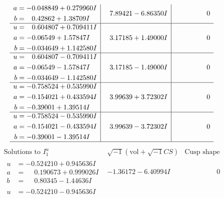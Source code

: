 \documentclass[1p]{elsarticle_modified}
\theoremstyle{definition}
\newcommand{\I}{\sqrt{-1}}
\begin{document}
$$\begin{array}{c|c|c}
\begin{aligned}
a &= -0.048849 + 0.279960 I \\
b &= \phantom{-}0.42862 + 1.38709 I\end{aligned}
 & \phantom{-}7.89421 - 6.86350 I & \phantom{-0.000000 } 0 \\ \hline\begin{aligned}
u &= \phantom{-}0.604807 + 0.709411 I \\
a &= -0.06549 + 1.57847 I \\
b &= -0.034649 + 1.142580 I\end{aligned}
 & \phantom{-}3.17185 + 1.49000 I & \phantom{-0.000000 } 0 \\ \hline\begin{aligned}
u &= \phantom{-}0.604807 - 0.709411 I \\
a &= -0.06549 - 1.57847 I \\
b &= -0.034649 - 1.142580 I\end{aligned}
 & \phantom{-}3.17185 - 1.49000 I & \phantom{-0.000000 } 0 \\ \hline\begin{aligned}
u &= -0.758524 + 0.535990 I \\
a &= -0.154021 + 0.433594 I \\
b &= -0.39001 + 1.39514 I\end{aligned}
 & \phantom{-}3.99639 + 3.72302 I & \phantom{-0.000000 } 0 \\ \hline\begin{aligned}
u &= -0.758524 - 0.535990 I \\
a &= -0.154021 - 0.433594 I \\
b &= -0.39001 - 1.39514 I\end{aligned}
 & \phantom{-}3.99639 - 3.72302 I & \phantom{-0.000000 } 0\\
 \hline 
 \end{array}$$\newpage$$\begin{array}{c|c|c}  
\text{Solutions to }I^u_{1}& \I (\text{vol} + \sqrt{-1}CS) & \text{Cusp shape}\\
 \hline 
\begin{aligned}
u &= -0.524210 + 0.945636 I \\
a &= \phantom{-}0.190673 + 0.999026 I \\
b &= \phantom{-}0.80345 - 1.44636 I\end{aligned}
 & -1.36172 - 6.40994 I & \phantom{-0.000000 } 0 \\ \hline\begin{aligned}
u &= -0.524210 - 0.945636 I \\

\end{aligned}
\end{array}$$
\end{document}
